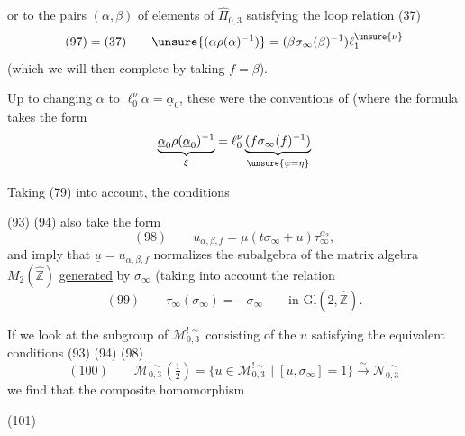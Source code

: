 
or to the pairs $(\alpha,\beta)$ of elements of $\widehat{\Pi}_{0,3}$
satisfying the loop relation (37)
\[
 (97)=(37)\qquad
 \unsure{(\alpha\rho(\alpha)^{-1})}
 =(\beta\sigma_\infty(\beta)^{-1})\ell_1^{\unsure{\nu}}
\]
(which we will then complete by taking $f=\beta$).


Up to changing $\alpha$ to $\ell_0^\nu\alpha=\underline{\alpha}_0$,
these were the conventions of  (where the formula
 takes the form
\[
 \underbrace{\underline{\alpha}_0\rho(\underline{\alpha}_0)^{-1}}_{\xi}
 =\ell_0^\nu
 \underbrace{(f\sigma_\infty(f)^{-1})}_{\unsure{\varphi=\eta}}
\]

Taking (79) into account, the conditions


(93) (94) also take the form
\[
 (98)\qquad u_{\alpha,\beta,f}
 =\mu(t\sigma_\infty+u)\tau_\infty^{\alpha_2},
\]
and imply that $\underline{u}=u_{\alpha,\beta,f}$
 normalizes the subalgebra of the matrix algebra
$M_2(\widehat{\mathbb Z})$ \uline{generated} by $\sigma_\infty$
(taking into account the relation
\[
 (99)\qquad \tau_\infty(\sigma_\infty)=-\sigma_\infty
 \qquad\text{in }\mathrm{Gl}(2,\widehat{\mathbb Z}).
\]

If we look at the subgroup of $\mathcal M_{0,3}^{!\sim}$
consisting of the $u$ satisfying the equivalent conditions (93) (94) (98)
\[
 (100)\qquad
 \mathcal M_{0,3}^{!\sim}\left(\tfrac12\right)
 =
 \{u\in\mathcal M_{0,3}^{!\sim}\mid [u,\sigma_\infty]=1\}
 \overset{\sim}{\longrightarrow}\mathcal N_{0,3}^{!\sim}
\]
we find that the composite homomorphism


(101)


